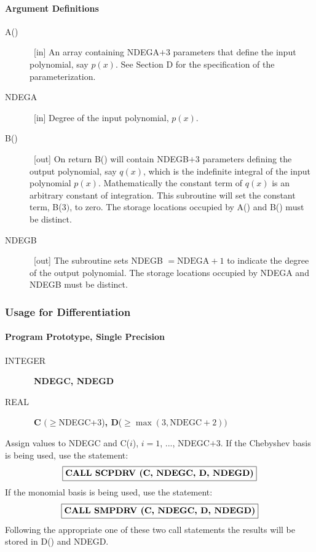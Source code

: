 \documentclass[twoside]{MATH77}
\begin{document}
\paragraph{Argument Definitions}
\begin{description}
\item[A()]  \ [in] An array containing NDEGA$+3$ parameters that define the
input polynomial, say $p(x)$. See Section D for the specification of the
parameterization.

\item[NDEGA]  \ [in] Degree of the input polynomial, $p(x).$

\item[B()]  \ [out] On return B() will contain NDEGB$+3$ parameters defining
the output polynomial, say $q(x)$, which is the indefinite integral of the
input polynomial $p(x)$. Mathematically the constant term of $q(x)$ is an
arbitrary constant of integration. This subroutine will set the constant
term, B($3)$, to zero. The storage locations occupied by A() and B() must be
distinct.

\item[NDEGB]  \ [out] The subroutine sets NDEGB $= \text{NDEGA}+1$ to indicate
the degree of the output polynomial. The storage locations occupied by NDEGA
and NDEGB must be distinct.
\end{description}
\subsubsection{Usage for Differentiation}

\paragraph{Program Prototype, Single Precision}
\begin{description}
\item[INTEGER]  \ {\bf NDEGC, NDEGD}

\item[REAL]  \ {\bf C} $(\geq $NDEGC+3){\bf , D}($\geq \max(3,\text{NDEGC}+2%
))$
\end{description}
Assign values to NDEGC and C($i$), $i = 1$, ..., NDEGC$+3$. If the Chebyshev
basis is being used, use the statement:
$$
\fbox{{\bf CALL SCPDRV (C, NDEGC, D, NDEGD)}}
$$
If the monomial basis is being used, use the statement:
$$
\fbox{{\bf CALL SMPDRV (C, NDEGC, D, NDEGD)}}
$$
Following the appropriate one of these two call statements the results will
be stored in D() and NDEGD.
\end{document}
